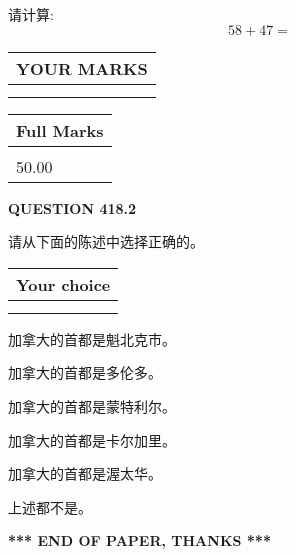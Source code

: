 \documentclass{ctexart}
\begin{document}
  
 
请计算:
\begin{equation}
58 +  %
47 = \nonumber
\end{equation}
 

 

 
  
\vspace{0.2in}
  
\noindent\begin{tabular}{|l|}
\hline
 YOUR MARKS  \\
\hline
 \\ 
 \\ 
\hline
\end{tabular}
\hspace{0.05in} \begin{tabular}{|l|}
\hline
 Full Marks  \\
\hline
 \\ 
50.00 \\
\hline
\end{tabular}
{\textbf{\Large{QUESTION
418.2 
}}}
  
  
请从下面的陈述中选择正确的。
  
  
\noindent\hspace{3.0in} \begin{tabular}{|l|}
\hline
Your choice \\
\hline
 \\ 
 \\ 
\hline
\end{tabular}
  
  
 
 
加拿大的首都是魁北克市。
 
 
加拿大的首都是多伦多。
 
 
加拿大的首都是蒙特利尔。
 
 
加拿大的首都是卡尔加里。
 
 
加拿大的首都是渥太华。
 
 
 上述都不是。
 
 
   
   
 \vspace{0.2in}
 
   
   
   
   
\vspace{1.0in} 
{\textbf{\large{ *** END OF PAPER, THANKS *** }}} 
   
\end{document}
